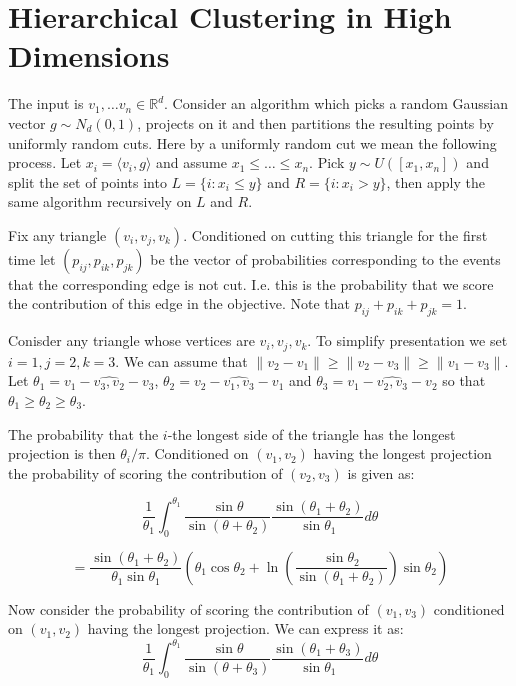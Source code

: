 \documentclass[twoside]{article}
\begin{document}
\section{Hierarchical Clustering in High Dimensions}
The input is $v_1, \dots v_n \in \mathbb R^d$. Consider an algorithm which picks a random Gaussian vector $g \sim N_d(0,1)$, projects on it and then partitions the resulting points by uniformly random cuts. Here by a uniformly random cut we mean the following process. Let $x_i = \langle v_i, g \rangle$ and assume $x_1 \le \dots \le x_n$. Pick $y \sim U([x_1, x_n])$ and split the set of points into $L = \{i \colon x_i \le y\}$ and $R = \{i \colon x_i > y\}$, then apply the same algorithm recursively on $L$ and $R$.

Fix any triangle $(v_i, v_j, v_k)$. Conditioned on cutting this triangle for the first time let $(p_{ij},p_{ik},p_{jk})$ be the vector of probabilities corresponding to the events that the corresponding edge is not cut. I.e. this is the probability that we score the contribution of this edge in the objective. Note that $p_{ij} + p_{ik} + p_{jk} = 1$.

Conisder any triangle whose vertices are $v_i, v_j, v_k$. To simplify presentation we set $i = 1, j = 2, k = 3$. We can assume that $\|v_2 - v_1\| \ge \|v_2 - v_3\| \ge \|v_1 - v_3\|$. Let $\theta_1 = \widehat{v_1 - v_3, v_2 - v_3}$, $\theta_2 = \widehat{v_2 - v_1, v_3 - v_1}$ and $\theta_3 = \widehat{v_1 - v_2, v_3 - v_2}$ so that $\theta_1 \ge \theta_2 \ge \theta_3$.

The probability that the $i$-the longest side of the triangle has the longest projection is then $\theta_i/\pi$. Conditioned on $(v_1, v_2)$ having the longest projection the probability of scoring the contribution of $(v_2, v_3)$ is given as:

$$\frac{1}{\theta_1} \int_{0}^{\theta_1} \frac{\sin \theta}{\sin (\theta + \theta_2)} \frac{\sin (\theta_1 + \theta_2)}{\sin \theta_1} d\theta $$

$$= \frac{\sin (\theta_1 + \theta_2)}{\theta_1 \sin \theta_1}\left(\theta_1 \cos \theta_2 + \ln\left(\frac{\sin \theta_2}{\sin (\theta_1 + \theta_2)}\right) \sin \theta_2 \right)$$

Now consider the probability of scoring the contribution of $(v_1,v_3)$ conditioned on $(v_1,v_2)$ having the longest projection.
We can express it as:
$$\frac{1}{\theta_1} \int_0^{\theta_1} \frac{\sin \theta}{\sin (\theta + \theta_3)} \frac{\sin(\theta_1 + \theta_3)}{\sin \theta_1} d\theta$$
\end{document}

